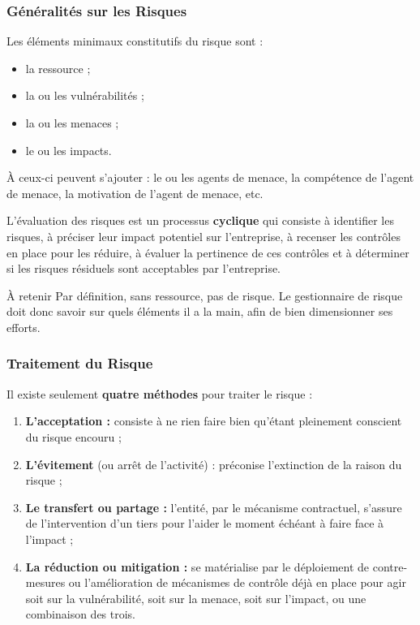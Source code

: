 \subsubsection{Généralités sur les Risques}

Les éléments minimaux constitutifs du risque sont :
\begin{itemize}
  \item la ressource ;
  \item la ou les vulnérabilités ;
  \item la ou les menaces ;
  \item le ou les impacts.
\end{itemize}

À ceux-ci peuvent s'ajouter : le ou les agents de menace, la compétence de l'agent
de menace, la motivation de l'agent de menace, etc.

L'évaluation des risques est un processus \textbf{cyclique} qui consiste à identifier
les risques, à préciser leur impact potentiel sur l'entreprise, à recenser les contrôles
en place pour les réduire, à évaluer la pertinence de ces contrôles et à déterminer si
les risques résiduels sont acceptables par l'entreprise.

\begin{boiteRemarque}{À retenir}
Par définition, sans ressource, pas de risque. Le gestionnaire de risque doit donc
savoir sur quels éléments il a la main, afin de bien dimensionner ses efforts.
\end{boiteRemarque}

\subsubsection{Traitement du Risque}

Il existe seulement \textbf{quatre méthodes} pour traiter le risque :

\begin{enumerate}
  \item \textbf{L'acceptation :} consiste à ne rien faire bien qu'étant pleinement
    conscient du risque encouru ;
  \item \textbf{L'évitement} (ou arrêt de l'activité) : préconise l'extinction de la
    raison du risque ;
  \item \textbf{Le transfert ou partage :} l'entité, par le mécanisme contractuel,
    s'assure de l'intervention d'un tiers pour l'aider le moment échéant à faire
    face à l'impact ;
  \item \textbf{La réduction ou mitigation :} se matérialise par le déploiement de
    contre-mesures ou l'amélioration de mécanismes de contrôle déjà en place pour
    agir soit sur la vulnérabilité, soit sur la menace, soit sur l'impact, ou une
    combinaison des trois.
\end{enumerate}

